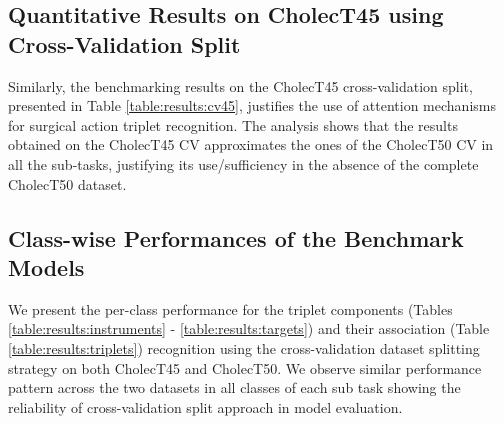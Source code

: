 \documentclass{article}
\begin{document}
{\subsection{Quantitative Results on CholecT45 using Cross-Validation Split}
Similarly, the benchmarking results on the CholecT45 cross-validation split, presented in Table \ref{table:results:cv45}, justifies the use of attention mechanisms for surgical action triplet recognition. The analysis shows that the results obtained on the CholecT45 CV approximates the ones of the CholecT50 CV in all the sub-tasks, justifying its use/sufficiency in the absence of the complete CholecT50 dataset.

\begin{table*}[ht]
\centering
    \setlength{\tabcolsep}{9pt}
    \captionsetup{skip=0pt,singlelinecheck=off,justification=raggedright}
    \caption{Benchmark triplet recognition AP (\%) on CholecT45 dataset using the official cross-validation split.}
    \label{table:results:cv45}
\end{table*} 



\subsection{Class-wise Performances of the Benchmark Models}
We present the per-class performance for the triplet components (Tables \ref{table:results:instruments} - \ref{table:results:targets}) and their association (Table \ref{table:results:triplets}) recognition using the cross-validation dataset splitting strategy on both CholecT45 and CholecT50. We observe similar performance pattern across the two datasets in all classes of each sub task showing the reliability of cross-validation split approach in model evaluation.

}
\end{document}
